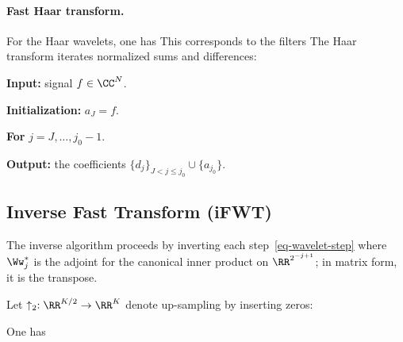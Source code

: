   
\paragraph{Fast Haar transform.}

For the Haar wavelets, one has
This corresponds to the filters
The Haar transform iterates normalized sums and differences:
\begin{rs}
	\item \textbf{Input:} signal $f \in \CC^N$.
	\item \textbf{Initialization:} $a_J = f$.
	\item \textbf{For} $j=J,\ldots,j_0-1$.
	\item \textbf{Output:} the coefficients $\{d_j\}_{J<j\leq j_0} \cup \{ a_{j_0} \}$.
\end{rs}

                                                            
\subsection{Inverse Fast Transform (iFWT)}

The inverse algorithm proceeds by inverting each step~\eqref{eq-wavelet-step}
where $\Ww_j^{*}$ is the adjoint for the canonical inner product on $\RR^{2^{-j+1}}$; in matrix form, it is the transpose.

Let $\uparrow_2 : \RR^{K/2} \rightarrow \RR^K$ denote up-sampling by inserting zeros:

\begin{prop}
One has
\end{prop}


